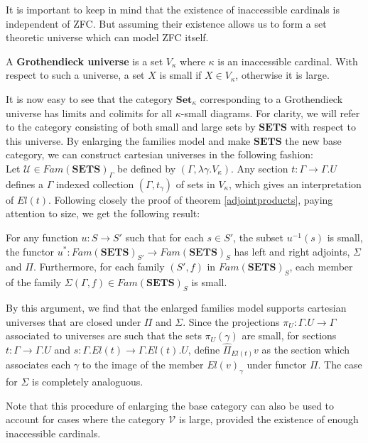 It is important to keep in mind that the existence of inaccessible cardinals is independent of ZFC. But assuming their existence allows us to form a set theoretic universe which can model ZFC itself.
\begin{defn}A \textbf{Grothendieck universe} is a set $V_\kappa$ where $\kappa$ is an inaccessible cardinal. With respect to such a universe, a set $X$ is small if $X \in V_\kappa$, otherwise it is large.
\end{defn}
It is now easy to see that the category $\mathbf{Set}_\kappa$ corresponding to a Grothendieck universe has limits and colimits for all $\kappa$-small diagrams. For clarity, we will refer to the category consisting of both small and large sets by $\mathbf{SETS}$ with respect to this universe. By enlarging the families model and make $\mathbf{SETS}$ the new base category, we can construct cartesian universes in the following fashion:\\
Let $\mathcal{U} \in Fam(\mathbf{SETS})_\Gamma$ be defined by $(\Gamma, \lambda \gamma. V_\kappa)$. Any section $t : \Gamma \to \Gamma.U$ defines a $\Gamma$ indexed collection $(\Gamma, t_\gamma)$ of sets in $V_\kappa$, which gives an interpretation of $El(t)$. Following closely the proof of theorem \ref{adjointproducts}, paying attention to size, we get the following result:
\begin{corl}
  For any function $u : S \to S'$  such that for each $s \in S'$, the subset $u^{-1}(s)$ is small, the functor  $u^* : Fam(\mathbf{SETS})_{S'} \to Fam(\mathbf{SETS})_S$ has left and right adjoints, $\Sigma$ and $\Pi$. Furthermore, for each family $(S', f)$ in $Fam(\mathbf{SETS})_S$, each member of the family $\Sigma(\Gamma, f) \in Fam(\mathbf{SETS})_S$ is small.
\end{corl}
By this argument, we find that the enlarged families model supports cartesian universes that are closed under $\Pi$ and $\Sigma$. Since the projections $\pi_U : \Gamma.U \to \Gamma$ associated to universes are such that the sets $\pi_U(\gamma)$ are small, for sections $t : \Gamma \to \Gamma.U$ and $s : \Gamma.El(t) \to \Gamma.El(t).U$, define $\hat \Pi_{El(t)}v$ as the section which associates each $\gamma$ to the image of the member $El(v)_\gamma$ under functor $\Pi$. The case for $\Sigma$ is completely analoguous.

Note that this procedure of enlarging the base category can also be used to account for cases where the category $\mathcal{V}$ is large, provided the existence of enough inaccessible cardinals.

